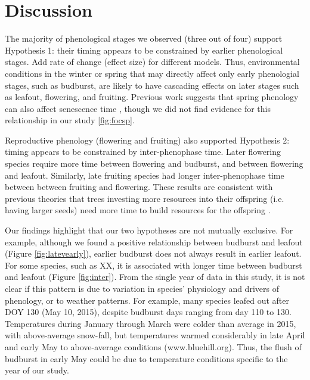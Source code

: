 \documentclass{article}
\begin{document}
\section* {Discussion}
\par The majority of phenological stages we observed (three out of four) support Hypothesis 1: their timing appears to be constrained by earlier phenological stages.  Add rate of change (effect size) for different models. Thus, environmental conditions in the winter or spring that may directly affect only early phenologial stages, such as budburst, are likely to have cascading effects on later stages such as leafout, flowering, and fruiting. Previous work suggests that spring phenology can also affect senescence time \citep {keenan2015}, though we did not find evidence for this relationship in our study \ref{fig:focsp}. 
\par Reproductive phenology (flowering and fruiting) also supported Hypothesis 2: timing appears to be constrained by inter-phenophase time. Later flowering species require more time between flowering and budburst,
and between flowering and leafout. Similarly, late fruiting species had longer inter-phenophase time between between fruiting and flowering.
These results are consistent with previous theories that trees investing more resources into their offspring (i.e. having larger seeds) need more time to build resources for the offspring \citep {bolmgren2008,sun2011}.

\par Our findings highlight that our two hypotheses are not mutually exclusive. For example, although we found a positive relationship between budburst and leafout (Figure \ref{fig:latevearly}), earlier budburst does not always result in earlier leafout. For some species, such as XX, it is associated with longer time between budburst and leafout (Figure \ref{fig:inter}). From the single year of data in this study, it is not clear if this pattern is due to variation in species' physiology and drivers of phenology, or to weather patterns. For example, many species leafed out after DOY 130 (May 10, 2015), despite budburst days ranging from day 110 to 130. Temperatures during January through March were colder than average in 2015, with above-average snow-fall, but temperatures warmed considerably in late April and early May to above-average conditions (www.bluehill.org). Thus, the flush of budburst in early May could be due to temperature conditions specific to the year of our study.
\end{document}
